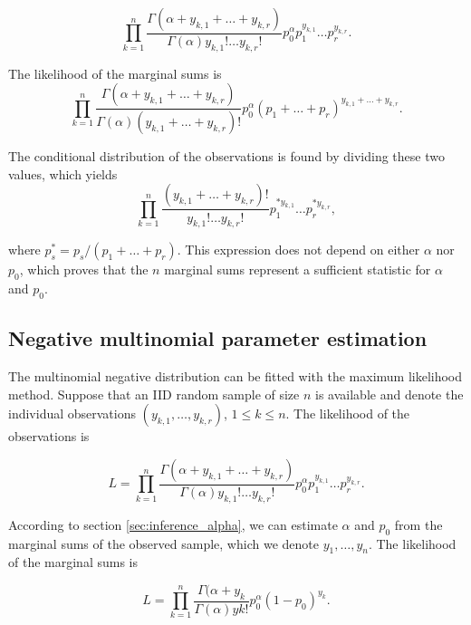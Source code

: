 \documentclass[12pt]{article}
\begin{document}
\begin{appendices}
    \begin{equation*}
      \prod_{k=1}^n \frac{\Gamma(\alpha+y_{k,1}+\ldots+y_{k,r})}
      {\Gamma(\alpha)y_{k,1}!\ldots y_{k,r}!}p_0^{\alpha}
      p_1^{y_{k,1}} \ldots p_r^{y_{k,r}}.
    \end{equation*}

    The likelihood of the marginal sums is
    \begin{equation*}
      \prod_{k=1}^n \frac{\Gamma(\alpha+y_{k,1}+\ldots+y_{k,r})}
      {\Gamma(\alpha)(y_{k,1}+\ldots+y_{k,r})!}p_0^{\alpha}
      (p_1+\ldots+p_r)^{y_{k,1}+\ldots+y_{k,r}}.
    \end{equation*}

    The conditional distribution of the observations is found by
    dividing these two values, which yields
    \begin{equation*}
      \prod_{k=1}^n \frac{(y_{k,1}+\ldots+y_{k,r})!}
      {y_{k,1}!\ldots y_{k,r}!}
      p_1^{*y_{k,1}} \ldots p_r^{*y_{k,r}},
    \end{equation*}

    \noindent
    where $p_s^* = p_s/(p_1 + \ldots + p_r)$. This expression
    does not depend on either $\alpha$ nor $p_0$, which proves
    that the $n$ marginal sums represent a sufficient statistic
    for $\alpha$ and $p_0$.

\subsection{Negative multinomial parameter estimation}
\label{sec:param_est_nm}

    The multinomial negative distribution can be fitted with the
    maximum likelihood method. Suppose that an IID random sample of
    size $n$ is available and denote the individual observations
    $(y_{k,1}, \ldots, y_{k,r})$, $1 \leq k \leq n$. The likelihood
    of the observations is

    \begin{equation*}
      L = \prod_{k=1}^n \frac{\Gamma(\alpha+y_{k,1}+\ldots+y_{k,r})}
        {\Gamma(\alpha)y_{k,1}!\ldots y_{k,r}!} p_0^{\alpha}
        p_1^{y_{k,1}}\ldots p_r^{y_{k,r}} .
    \end{equation*}

    According to section \ref{sec:inference_alpha}, we can estimate
    $\alpha$ and $p_0$ from the marginal sums of the observed sample,
    which we denote $y_1, \ldots, y_n$. The likelihood of the marginal
    sums is

    \begin{equation*}
      L = \prod_{k=1}^n \frac{\Gamma(\alpha+y_k}
        {\Gamma(\alpha)yk!} p_0^{\alpha}
        (1-p_0)^{y_k} .
    \end{equation*}


\end{appendices}
\end{document}
